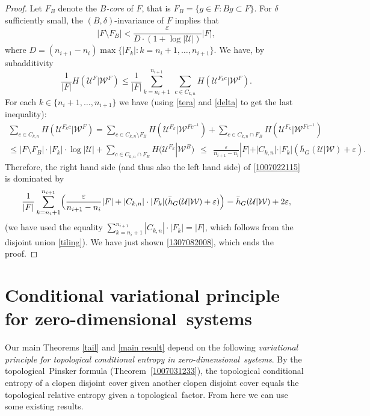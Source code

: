 \documentclass[12pt]{amsart}
\theoremstyle{definition}
\numberwithin{equation}{section}
\newcommand{\CU}{\mathcal{U}}
\newcommand{\CW}{\mathcal{W}}
\def \tl {topological}
\def \zd {zero-dimen\-sio\-nal}
\def \eps {\varepsilon}
\def \CU {\mathcal U}
\def \tl {topological}
\begin{document}
\begin{proof}
Let $F_B$ denote the \emph{$B$-core} of $F$, that is $F_B=\{g\in F: Bg\subset F\}$. For $\delta$ sufficiently small, the $(B,\delta)$-invariance of $F$ implies that 
\begin{equation}\label{delta}
|F\setminus F_B|<\frac{\eps}{D\cdot (1+ \log|\CU|)}|F|, 
\end{equation}
where $D=(n_{i+1}-n_i)\max\{|F_k|:k=n_i+1,\dots,n_{i+1}\}$. We have, by subadditivity
\begin{equation} \label{1007022115}
\frac{1}{|F|}H(\CU^{F}|\CW^{F})
\le \frac1{|F|}\sum_{k=n_i+1}^{n_{i+1}}\ \sum_{c\in C_{k,n}}H(\CU^{F_kc}|\CW^F).
\end{equation}
For each $k\in\{n_i+1,\dots,n_{i+1}\}$ we have (using \eqref{tera} and \eqref{delta} to get the last inequality):
\begin{multline*}
\sum_{c\in C_{k,n}}H(\CU^{F_kc}|\CW^F) =
\sum_{c\in C_{k,n}\setminus F_B}H(\CU^{F_k}|\CW^{Fc^{-1}})+
\sum_{c\in C_{k,n}\cap F_B}H(\CU^{F_k}|\CW^{Fc^{-1}})\\
\le |F\setminus F_B|\cdot |F_k|\cdot \log|\CU|+
\sum_{c\in C_{k,n}\cap F_B}H(\CU^{F_k}|\CW^{B})
\ \ \le \ \ \frac\eps{n_{i+1}-n_i}|F|+|C_{k,n}|\cdot |F_k|(\bar h_G(\CU|\CW)+\eps).
\end{multline*}
Therefore, the right hand side (and thus also the left hand side) of \eqref{1007022115} is dominated by
$$
\frac1{|F|}\sum_{k=n_i+1}^{n_{i+1}} \Bigl(\frac\eps{n_{i+1}-n_i}|F|+|C_{k,n}|\cdot |F_k|(\bar h_G(\CU|\CW)+\eps)\Bigr) = \bar h_G(\CU|\CW)+2\eps,
$$
(we have used the equality $\sum_{k=n_i+1}^{n_{i+1}}|C_{k,n}|\cdot |F_k|=|F|$, which follows from the disjoint union \eqref{tiling}). We have just shown \eqref{1307082008}, which ends the proof.
\end{proof}

\section{Conditional variational principle for \zd\ systems}

Our main Theorems \ref{tail} and \ref{main result} depend on the following \emph{variational principle for topological conditional entropy in \zd\ systems}. By the \tl\ Pinsker formula (Theorem~\ref{1007031233}), the topological conditional entropy of a clopen disjoint cover given another clopen disjoint cover equals the topological relative entropy given a \tl\ factor. From here we can use some existing results.
\end{document}
